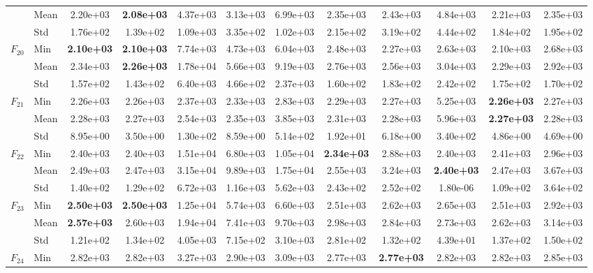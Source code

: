 \begin{center}
\begin{longtable}{clcccccccccc}
 & Mean & 2.20e+03 & \textbf{2.08e+03} & 4.37e+03 & 3.13e+03 & 6.99e+03 & 2.35e+03 & 2.43e+03 & 4.84e+03 & 2.21e+03 & 2.35e+03 \\
 & Std & 1.76e+02 & 1.39e+02 & 1.09e+03 & 3.35e+02 & 1.02e+03 & 2.15e+02 & 3.19e+02 & 4.44e+02 & 1.84e+02 & 1.95e+02 \\
\midrule
\multirow{3}{*}{$F_{20}$} & Min & \textbf{2.10e+03} & \textbf{2.10e+03} & 7.74e+03 & 4.73e+03 & 6.04e+03 & 2.48e+03 & 2.27e+03 & 2.63e+03 & 2.10e+03 & 2.68e+03 \\
 & Mean & 2.34e+03 & \textbf{2.26e+03} & 1.78e+04 & 5.66e+03 & 9.19e+03 & 2.76e+03 & 2.56e+03 & 3.04e+03 & 2.29e+03 & 2.92e+03 \\
 & Std & 1.57e+02 & 1.43e+02 & 6.40e+03 & 4.66e+02 & 2.37e+03 & 1.60e+02 & 1.83e+02 & 2.42e+02 & 1.75e+02 & 1.70e+02 \\
\midrule
\multirow{3}{*}{$F_{21}$} & Min & 2.26e+03 & 2.26e+03 & 2.37e+03 & 2.33e+03 & 2.83e+03 & 2.29e+03 & 2.27e+03 & 5.25e+03 & \textbf{2.26e+03} & 2.27e+03 \\
 & Mean & 2.28e+03 & 2.27e+03 & 2.54e+03 & 2.35e+03 & 3.85e+03 & 2.31e+03 & 2.28e+03 & 5.96e+03 & \textbf{2.27e+03} & 2.28e+03 \\
 & Std & 8.95e+00 & 3.50e+00 & 1.30e+02 & 8.59e+00 & 5.14e+02 & 1.92e+01 & 6.18e+00 & 3.40e+02 & 4.86e+00 & 4.69e+00 \\
\midrule
\multirow{3}{*}{$F_{22}$} & Min & 2.40e+03 & 2.40e+03 & 1.51e+04 & 6.80e+03 & 1.05e+04 & \textbf{2.34e+03} & 2.88e+03 & 2.40e+03 & 2.41e+03 & 2.96e+03 \\
 & Mean & 2.49e+03 & 2.47e+03 & 3.15e+04 & 9.89e+03 & 1.75e+04 & 2.55e+03 & 3.24e+03 & \textbf{2.40e+03} & 2.47e+03 & 3.67e+03 \\
 & Std & 1.40e+02 & 1.29e+02 & 6.72e+03 & 1.16e+03 & 5.62e+03 & 2.43e+02 & 2.52e+02 & 1.80e-06 & 1.09e+02 & 3.64e+02 \\
\midrule
\multirow{3}{*}{$F_{23}$} & Min & \textbf{2.50e+03} & \textbf{2.50e+03} & 1.25e+04 & 5.74e+03 & 6.60e+03 & 2.51e+03 & 2.62e+03 & 2.65e+03 & 2.51e+03 & 2.92e+03 \\
 & Mean & \textbf{2.57e+03} & 2.60e+03 & 1.94e+04 & 7.41e+03 & 9.70e+03 & 2.98e+03 & 2.84e+03 & 2.73e+03 & 2.62e+03 & 3.14e+03 \\
 & Std & 1.21e+02 & 1.34e+02 & 4.05e+03 & 7.15e+02 & 3.10e+03 & 2.81e+02 & 1.32e+02 & 4.39e+01 & 1.37e+02 & 1.50e+02 \\
\midrule
\multirow{3}{*}{$F_{24}$} & Min & 2.82e+03 & 2.82e+03 & 3.27e+03 & 2.90e+03 & 3.09e+03 & 2.77e+03 & \textbf{2.77e+03} & 2.82e+03 & 2.82e+03 & 2.85e+03 \\

\end{longtable}
\end{center}
